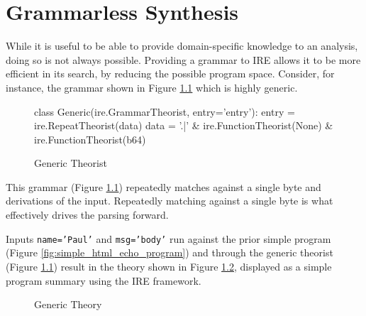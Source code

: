 \chapter{Grammarless Synthesis}

While it is useful to be able to provide domain-specific knowledge to an analysis, doing so is not always possible.
Providing a grammar to IRE allows it to be more efficient in its search, by reducing the possible program space.
Consider, for instance, the grammar shown in Figure \ref{fig:generic_theorist} which is highly generic.

\begin{figure}[tb]
\begin{pythoncode}
class Generic(ire.GrammarTheorist, entry='entry'):
    entry = ire.RepeatTheorist(data)
    data = '.|\n' & ire.FunctionTheorist(None) & ire.FunctionTheorist(b64)
\end{pythoncode}
\caption{Generic Theorist}
\label{fig:generic_theorist}
\end{figure}

This grammar (Figure \ref{fig:generic_theorist}) repeatedly matches against a single byte and derivations of the input.
Repeatedly matching against a single byte is what effectively drives the parsing forward.

Inputs \texttt{name='Paul'} and \texttt{msg='body'} run against the prior simple program (Figure \ref{fig:simple_html_echo_program}) and through the generic theorist (Figure \ref{fig:generic_theorist}) result in the theory shown in Figure \ref{fig:generic_theory}, displayed as a simple program summary using the IRE framework.

\begin{figure}[tb]
\caption{Generic Theory}
\label{fig:generic_theory}
\end{figure}

